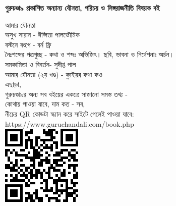 \clearpage
\small
\centering
\textbf{গুরুচণ্ডা৯ প্রকাশিত অন্যান্য যৌনতা, পরিচয় ও লিঙ্গরাজনীতি বিষয়ক বই} \\
\raggedright
\scriptsize
আমার যৌনতা \\
অসুখ সারান - ঈপ্সিতা পালভৌমিক \\
বস্টনে বংগে - বর্ন ফ্রি \\
নৈঃশব্দের পত্রগুচ্ছ - কথা ও শব্দঃ অভিজিৎ। ছবি, ভাবনা ও নির্দেশনাঃ অর্চন। \\ 
সমকামিতা ও বিবর্তন- সুদীপ্ত পাল \\
আমার যৌনতা (২য় খণ্ড) - ক্যুইয়র কথা কও \\
\baselineskip
\raggedleft
\scriptsize
এছাড়া, \\
গুরুচণ্ডা৯র অন্য সব বইয়ের একত্রে সাজানো সমস্ত তথ্য - \\
কোথায় পাওয়া যাবে, দাম কত - সব, \\
নীচের QR কোডটা স্ক্যান করে সাইটে গেলেই পাওয়া যাবে: \\
https://www.guruchandali.com/book.php \\
\baselineskip
\includegraphics[scale=0.8]{Images/QRCode_2022.png}